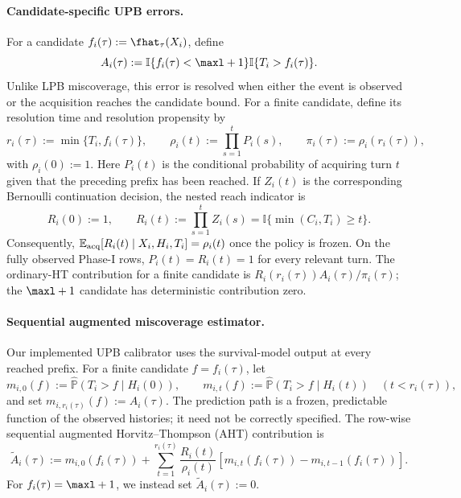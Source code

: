 \paragraph{Candidate-specific UPB errors.}
For a candidate $f_i(\tau):=\fhat_\tau(X_i)$, define
\begin{equation}
    A_i(\tau)
    :=\mathbb I\{f_i(\tau)<\maxl+1\}
      \mathbb I\{T_i>f_i(\tau)\}.
    \label{eq:upb_target_indicator}
\end{equation}
Unlike LPB miscoverage, this error is resolved when either the event is
observed or the acquisition reaches the candidate bound. For a finite
candidate, define its resolution time and resolution propensity by
\begin{equation}
    r_i(\tau):=\min\{T_i,f_i(\tau)\},
    \qquad
    \rho_i(t):=\prod_{s=1}^{t}P_i(s),
    \qquad
    \pi_i(\tau):=\rho_i(r_i(\tau)),
    \label{eq:upb_candidate_weight}
\end{equation}
with $\rho_i(0):=1$. Here $P_i(t)$ is the conditional probability of
acquiring turn $t$ given that the preceding prefix has been reached. If
$Z_i(t)$ is the corresponding Bernoulli continuation decision, the nested
reach indicator is
\begin{equation}
    R_i(0):=1,
    \qquad
    R_i(t):=\prod_{s=1}^{t}Z_i(s)
           =\mathbb I\{\min(C_i,T_i)\geq t\}.
    \label{eq:upb_reach_indicator}
\end{equation}
Consequently,
$\mathbb E_{\rm acq}[R_i(t)\mid X_i,H_i,T_i]=\rho_i(t)$ once the policy is
frozen. On the fully observed Phase-I rows, $P_i(t)=R_i(t)=1$ for every
relevant turn. The ordinary-HT contribution for a finite candidate is
$R_i(r_i(\tau))A_i(\tau)/\pi_i(\tau)$; the $\maxl+1$ candidate has
deterministic contribution zero.

\paragraph{Sequential augmented miscoverage estimator.}
Our implemented UPB calibrator uses the survival-model output at every reached
prefix. For a finite candidate $f=f_i(\tau)$, let
\begin{equation}
    m_{i,0}(f):=\widehat{\mathbb P}(T_i>f\mid H_i(0)),
    \qquad
    m_{i,t}(f):=\widehat{\mathbb P}(T_i>f\mid H_i(t))
    \quad (t<r_i(\tau)),
\end{equation}
and set $m_{i,r_i(\tau)}(f):=A_i(\tau)$. The prediction path is a frozen,
predictable function of the observed histories; it need not be correctly
specified. The row-wise sequential augmented Horvitz--Thompson (AHT)
contribution is
\begin{equation}
    \widetilde A_i(\tau)
    :=m_{i,0}(f_i(\tau))
      +\sum_{t=1}^{r_i(\tau)}
       \frac{R_i(t)}{\rho_i(t)}
       \left[m_{i,t}(f_i(\tau))-m_{i,t-1}(f_i(\tau))\right].
    \label{eq:upb_sequential_aht}
\end{equation}
For $f_i(\tau)=\maxl+1$, we instead set
$\widetilde A_i(\tau):=0$.

